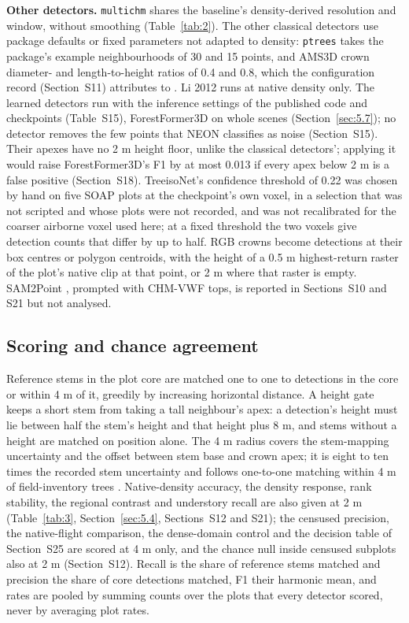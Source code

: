 \documentclass[preprint,12pt,authoryear,a4paper]{elsarticle}
\begin{document}
\textbf{Other detectors.} \texttt{multichm} shares the baseline's density-derived resolution
and window, without smoothing (Table~\ref{tab:2}). The other classical detectors use
package defaults or fixed parameters not adapted to density: \texttt{ptrees} takes the
package's example neighbourhoods of 30 and 15 points, and AMS3D crown diameter-
and length-to-height ratios of 0.4 and 0.8, which the configuration record
(Section~S11) attributes to \citet{ferraz2016lidar}. Li 2012 runs at native density
only. The learned detectors run with the inference settings of the published
code and checkpoints (Table~S15), ForestFormer3D on whole scenes (Section~\ref{sec:5.7});
no detector removes the few points that NEON classifies as noise (Section~S15).
Their apexes have no 2 m height floor, unlike the classical detectors'; applying
it would raise ForestFormer3D's F1 by at most 0.013 if every apex below 2 m is a
false positive (Section~S18). TreeisoNet's confidence threshold of 0.22 was
chosen by hand on five SOAP plots at the checkpoint's own voxel, in a selection
that was not scripted and whose plots were not recorded, and was not
recalibrated for the coarser airborne voxel used here; at a fixed threshold the
two voxels give detection counts that differ by up to half. RGB crowns become
detections at their box centres or polygon centroids, with the height of a 0.5 m
highest-return raster of the plot's native clip at that point, or 2 m where that
raster is empty. SAM2Point \citep{guo2024sam2point}, prompted with CHM-VWF tops, is
reported in Sections~S10 and S21 but not analysed.

\subsection{Scoring and chance agreement}\label{sec:4.2}

Reference stems in the plot core are matched one to one to detections in the
core or within 4 m of it, greedily by increasing horizontal distance. A height
gate keeps a short stem from taking a tall neighbour's apex: a detection's
height must lie between half the stem's height and that height plus 8 m, and
stems without a height are matched on position alone. The 4 m radius covers the
stem-mapping uncertainty and the offset between stem base and crown apex; it is
eight to ten times the recorded stem uncertainty and follows one-to-one matching
within 4 m of field-inventory trees \citep{gominski2025mining}. Native-density
accuracy, the density response, rank stability, the regional contrast and
understory recall are also given at 2 m (Table~\ref{tab:3}, Section~\ref{sec:5.4}, Sections~S12 and
S21); the censused precision, the native-flight comparison, the dense-domain
control and the decision table of Section~S25 are scored at 4 m only, and the
chance null inside censused subplots also at 2 m (Section~S12). Recall is the
share of reference stems matched and precision the share of core detections
matched, F1 their harmonic mean, and rates are pooled by summing counts over the
plots that every detector scored, never by averaging plot rates.
\end{document}

